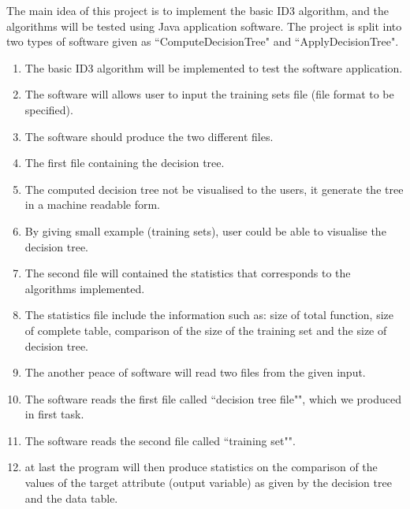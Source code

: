 \documentclass{report}
\begin{document}
The main idea of this project is to implement the basic ID3 algorithm, and the algorithms will be tested using Java application software. The project is split into two types of software given as ``ComputeDecisionTree" and ``ApplyDecisionTree". 

    
\begin{enumerate}


\item The basic ID3 algorithm will be implemented to test the software application.

\item The software will allows user to input the training sets file (file format to be specified).
   
\item The software should produce the two different files.
  
\item The first file containing the decision tree.

\item The computed decision tree not be visualised to the users, it generate the tree in a machine readable form. 
	
\item By giving small example (training sets), user could be able to visualise the decision tree. 
	
\item The second file will contained the statistics that corresponds to the algorithms implemented.
	
\item The statistics file include the information such as: size of total function, size of complete table, comparison of the size of the training set and the size of decision tree.
	
\item The another peace of software will read two files from the given input.

\item The software reads the first file called ``decision tree file"", which we produced in first task.

\item The software reads the second file called ``training set"".
	
\item at last the program will then produce statistics on the comparison of the values of the target attribute (output variable) as given by the decision tree and the data table.

\end{enumerate}





\end{document}
